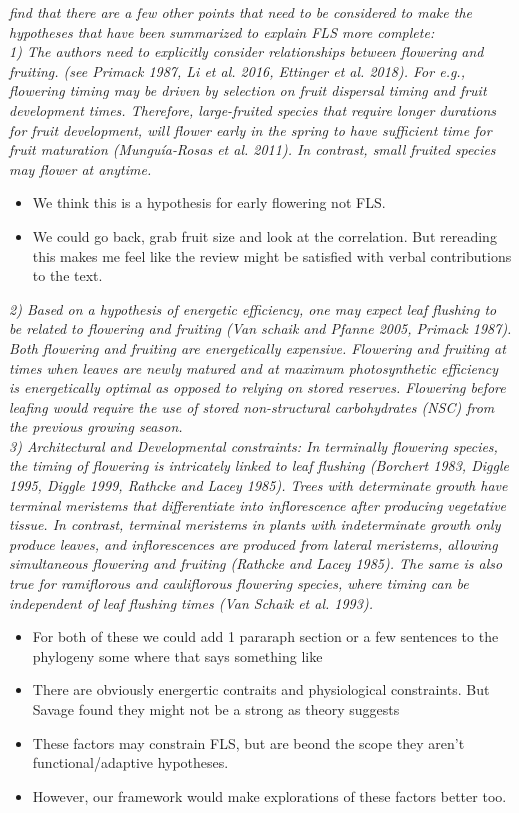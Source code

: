 \documentclass{article}[11pt]
\begin{document}
\emph{ find that there are a few other points that need to be considered to make the hypotheses that have been summarized to explain FLS more complete:\\
1) The authors need to explicitly consider relationships between flowering and fruiting. (see Primack 1987, Li et al. 2016, Ettinger et al. 2018). For e.g., flowering timing may be driven by selection on fruit dispersal timing and fruit development times. Therefore, large-fruited species that require longer durations for fruit development, will flower early in the spring to have sufficient time for fruit maturation (Munguía‐Rosas et al. 2011). In contrast, small fruited species may flower at anytime.}\\
\begin{itemize}
\item We think this is a hypothesis for early flowering not FLS.
\item We could go back, grab fruit size and look at the correlation. But rereading this makes me feel like the review might be satisfied with verbal contributions to the text.
\end{itemize}
\emph{2) Based on a hypothesis of energetic efficiency, one may expect leaf flushing to be related to flowering and fruiting (Van schaik and Pfanne 2005, Primack 1987). Both flowering and fruiting are energetically expensive. Flowering and fruiting at times when leaves are newly matured and at maximum photosynthetic efficiency is energetically optimal as opposed to relying on stored reserves. Flowering before leafing would require the use of stored non-structural carbohydrates (NSC) from the previous growing season.\\

3) Architectural and Developmental constraints: In terminally flowering species, the timing of flowering is intricately linked to leaf flushing (Borchert 1983, Diggle 1995, Diggle 1999, Rathcke and Lacey 1985). Trees with determinate growth have terminal meristems that differentiate into inflorescence after producing vegetative tissue. In contrast, terminal meristems in plants with indeterminate growth only produce leaves, and inflorescences are produced from lateral meristems, allowing simultaneous flowering and fruiting (Rathcke and Lacey 1985). The same is also true for ramiflorous and cauliflorous flowering species, where timing can be independent of leaf flushing times (Van Schaik et al. 1993).}
\begin{itemize}
\item For both of these we could add 1 pararaph section or a few sentences to the phylogeny some where that says something like
\item There are obviously energertic contraits and physiological constraints. But Savage found they might not be a strong as theory suggests
\item These factors may constrain FLS, but are beond the scope they aren't functional/adaptive hypotheses. 
\item However, our framework would make explorations of these factors better too.
\end{itemize}
\end{document}
